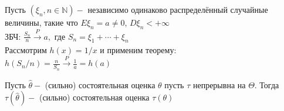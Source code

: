 \documentclass[11pt,fleqn]{book} %
\def\t{\theta}
\def\T{\Theta}
\def\H{\hat{\theta}}
\def\PT{\xrightarrow[] {P}}
\begin{document}
\begin{exa}
Пусть  $(\xi_n , n\in \mathbb{N}) - $ независимо одинаково распределённый случайные величины, такие что $E \xi_n = a \neq 0$, $D\xi_n < + \infty$ \\ ЗБЧ: $\frac{S_n}{n} \PT a, $ где $S_n = \xi_1 + \cdots + \xi_n$ \\ Рассмотрим $h(x) = 1/x$ и применим теорему: \\ $h(S_n/n) = \frac{n}{S_n} \PT \frac{1}{a} = h(a)$   
\end{exa}

\begin{proposition}
Пусть $\H -$ (сильно) состоятельная оценка $\t$ пусть $\tau$ непрерывна на $\T$. Тогда $\tau(\H) - $ (сильно) состоятельная оценка $\tau(\t)$ 
\end{proposition}
\end{document}
